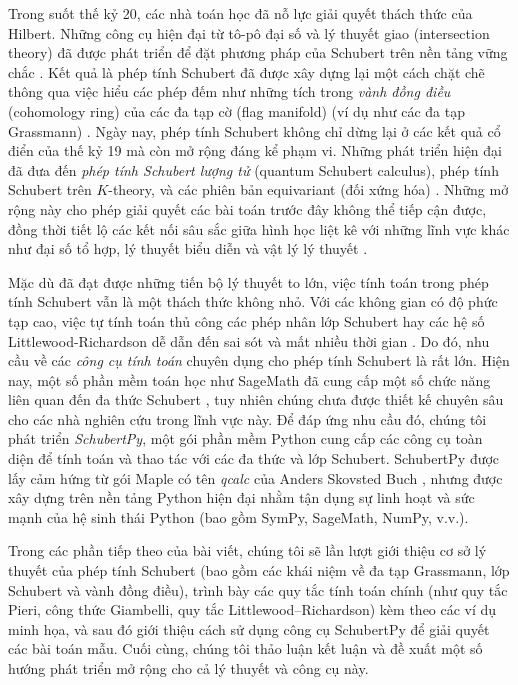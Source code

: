 Trong suốt thế kỷ 20, các nhà toán học đã nỗ lực giải quyết thách thức của Hilbert. Những công cụ hiện đại từ tô-pô đại số và lý thuyết giao (intersection theory) đã được phát triển để đặt phương pháp của Schubert trên nền tảng vững chắc \cite{Kontsevich_1994}. Kết quả là phép tính Schubert đã được xây dựng lại một cách chặt chẽ thông qua việc hiểu các phép đếm như những tích trong \textit{vành đồng điều} (cohomology ring) của các đa tạp cờ (flag manifold) (ví dụ như các đa tạp Grassmann) \cite{BERTRAM1999728}. Ngày nay, phép tính Schubert không chỉ dừng lại ở các kết quả cổ điển của thế kỷ 19 mà còn mở rộng đáng kể phạm vi. Những phát triển hiện đại đã đưa đến \textit{phép tính Schubert lượng tử} (quantum Schubert calculus), phép tính Schubert trên $K$-theory, và các phiên bản equivariant (đối xứng hóa) \cite{ALCO_2018__1_3_327_0}. Những mở rộng này cho phép giải quyết các bài toán trước đây không thể tiếp cận được, đồng thời tiết lộ các kết nối sâu sắc giữa hình học liệt kê với những lĩnh vực khác như đại số tổ hợp, lý thuyết biểu diễn và vật lý lý thuyết \cite{Encyclo_schubert_calculus}.

Mặc dù đã đạt được những tiến bộ lý thuyết to lớn, việc tính toán trong phép tính Schubert vẫn là một thách thức không nhỏ. Với các không gian có độ phức tạp cao, việc tự tính toán thủ công các phép nhân lớp Schubert hay các hệ số Littlewood-Richardson dễ dẫn đến sai sót và mất nhiều thời gian \cite{graysonschubert2}. Do đó, nhu cầu về các \textit{công cụ tính toán} chuyên dụng cho phép tính Schubert là rất lớn. Hiện nay, một số phần mềm toán học như SageMath đã cung cấp một số chức năng liên quan đến đa thức Schubert \cite{sagemath}, tuy nhiên chúng chưa được thiết kế chuyên sâu cho các nhà nghiên cứu trong lĩnh vực này. Để đáp ứng nhu cầu đó, chúng tôi phát triển \textit{SchubertPy}, một gói phần mềm Python cung cấp các công cụ toàn diện để tính toán và thao tác với các đa thức và lớp Schubert. SchubertPy được lấy cảm hứng từ gói Maple có tên \textit{qcalc} của Anders Skovsted Buch \cite{buch2008qcalc}, nhưng được xây dựng trên nền tảng Python hiện đại nhằm tận dụng sự linh hoạt và sức mạnh của hệ sinh thái Python (bao gồm SymPy, SageMath, NumPy, v.v.).

Trong các phần tiếp theo của bài viết, chúng tôi sẽ lần lượt giới thiệu cơ sở lý thuyết của phép tính Schubert (bao gồm các khái niệm về đa tạp Grassmann, lớp Schubert và vành đồng điều), trình bày các quy tắc tính toán chính (như quy tắc Pieri, công thức Giambelli, quy tắc Littlewood–Richardson) kèm theo các ví dụ minh họa, và sau đó giới thiệu cách sử dụng công cụ SchubertPy để giải quyết các bài toán mẫu. Cuối cùng, chúng tôi thảo luận kết luận và đề xuất một số hướng phát triển mở rộng cho cả lý thuyết và công cụ này.